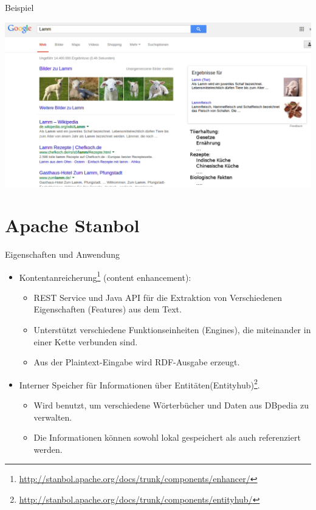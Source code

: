 \documentclass{beamer}
\begin{document}
  \begin{frame}[c]{Beispiel}
  \begin{center}
  \includegraphics[width=0.7\linewidth]{pics/google-enchanced.png}
  \end{center}
  \end{frame}
  
  \section{Apache Stanbol}
  
  \begin{frame}[c]{Eigenschaften und Anwendung}
  \begin{itemize}
  \item Kontentanreicherung\footnote{\url{http://stanbol.apache.org/docs/trunk/components/enhancer/}} (content enhancement):
  \begin{itemize}
  \item REST Service und Java API für die Extraktion von Verschiedenen Eigenschaften (Features) aus dem Text.
  \item Unterstützt verschiedene Funktionseinheiten (Engines), die miteinander in einer Kette verbunden sind.
  \item Aus der Plaintext-Eingabe wird RDF-Ausgabe erzeugt. 
  \end{itemize}
  \item Interner Speicher für Informationen über Entitäten(Entityhub)\footnote{\url{http://stanbol.apache.org/docs/trunk/components/entityhub/}}.
  \begin{itemize}
  \item Wird benutzt, um verschiedene Wörterbücher und Daten aus DBpedia zu verwalten.
  \item Die Informationen können sowohl lokal gespeichert als auch referenziert werden.
  \end{itemize}
  \end{itemize}
  \end{frame}
  
\end{document}
